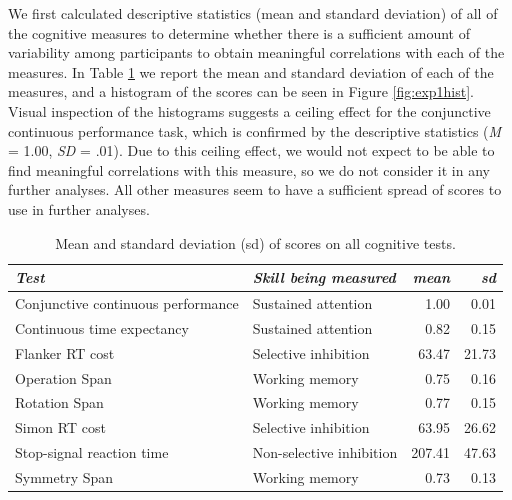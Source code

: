 \documentclass[
  man,floatsintext]{apa6}
\begin{document}
We first calculated descriptive statistics (mean and standard deviation) of all of the cognitive measures to determine whether there is a sufficient amount of variability among participants to obtain meaningful correlations with each of the measures. In Table \ref{tab:cogskillsdesstats} we report the mean and standard deviation of each of the measures, and a histogram of the scores can be seen in Figure \ref{fig:exp1hist}. Visual inspection of the histograms suggests a ceiling effect for the conjunctive continuous performance task, which is confirmed by the descriptive statistics (\emph{M} = 1.00, \emph{SD} = .01). Due to this ceiling effect, we would not expect to be able to find meaningful correlations with this measure, so we do not consider it in any further analyses. All other measures seem to have a sufficient spread of scores to use in further analyses.

\begin{table}

\caption{\label{tab:cogskillsdesstats}Mean and standard deviation (sd) of scores on all cognitive tests.}
\centering
\begin{tabular}[t]{llrr}
\toprule
\em{Test} & \em{Skill being measured} & \em{mean} & \em{sd}\\
\midrule
Conjunctive continuous
 performance & Sustained attention & 1.00 & 0.01\\
Continuous time
 expectancy & Sustained attention & 0.82 & 0.15\\
Flanker RT cost & Selective inhibition & 63.47 & 21.73\\
Operation Span & Working memory & 0.75 & 0.16\\
Rotation Span & Working memory & 0.77 & 0.15\\
\addlinespace
Simon RT cost & Selective inhibition & 63.95 & 26.62\\
Stop-signal reaction time & Non-selective inhibition & 207.41 & 47.63\\
Symmetry Span & Working memory & 0.73 & 0.13\\
\bottomrule
\end{tabular}
\end{table}
\end{document}
